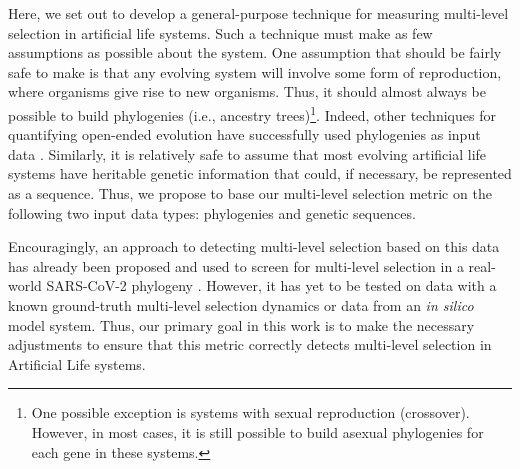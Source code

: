 Here, we set out to develop a general-purpose technique for measuring multi-level selection in artificial life systems. Such a technique must make as few assumptions as possible about the system. One assumption that should be fairly safe to make is that any evolving system will involve some form of reproduction, where organisms give rise to new organisms. Thus, it should almost always be possible to build phylogenies (i.e., ancestry trees)\footnote{One possible exception is systems with sexual reproduction (crossover). However, in most cases, it is still possible to build asexual phylogenies for each gene in these systems.}. Indeed, other techniques for quantifying open-ended evolution have successfully used phylogenies as input data \citep{dolson2019modes}. Similarly, it is relatively safe to assume that most evolving artificial life systems have heritable genetic information that could, if necessary, be represented as a sequence. Thus, we propose to base our multi-level selection metric on the following two input data types: phylogenies and genetic sequences.

Encouragingly, an approach to detecting multi-level selection based on this data has already been proposed and used to screen for multi-level selection in a real-world SARS-CoV-2 phylogeny \citep{BonettiFranceschi2024phylogenetic}.
However, it has yet to be tested on data with a known ground-truth multi-level selection dynamics or data from an \textit{in silico} model system.
Thus, our primary goal in this work is to make the necessary adjustments to ensure that this metric correctly detects multi-level selection in Artificial Life systems.



